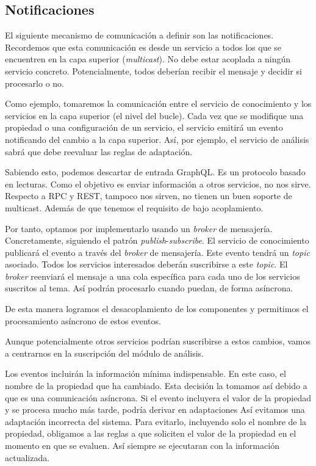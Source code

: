 \subsection{Notificaciones}

El siguiente mecanismo de comunicación a definir son las notificaciones. Recordemos que esta comunicación es desde un servicio a todos los que se encuentren en la capa superior (\emph{multicast}). No debe estar acoplada a ningún servicio concreto. Potencialmente, todos deberían recibir el mensaje y decidir si procesarlo o no.

Como ejemplo, tomaremos la comunicación entre el servicio de conocimiento y los servicios en la capa superior (el nivel del bucle). Cada vez que se modifique una propiedad o una configuración de un servicio, el servicio emitirá un evento notificando del cambio a la capa superior. Así, por ejemplo, el servicio de análisis sabrá que debe reevaluar las reglas de adaptación.

Sabiendo esto, podemos descartar de entrada GraphQL. Es un protocolo basado en lecturas. Como el objetivo es enviar información a otros servicios, no nos sirve. Respecto a RPC y REST, tampoco nos sirven, no tienen un buen soporte de multicast. Además de que tenemos el requisito de bajo acoplamiento.

Por tanto, optamos por implementarlo usando un \emph{broker} de mensajería. Concretamente, siguiendo el patrón \emph{publish}-\emph{subscribe}. El servicio de conocimiento publicará el evento a través del \emph{broker} de mensajería. Este evento tendrá un \emph{topic} asociado. Todos los servicios interesados deberán suscribirse a este \emph{topic}. El \emph{broker} reenviará el mensaje a una cola específica para cada uno de los servicios suscritos al tema. Así podrán procesarlo cuando puedan, de forma asíncrona.

De esta manera logramos el desacoplamiento de los componentes y permitimos el procesamiento asíncrono de estos eventos.

Aunque potencialmente otros servicios podrían suscribirse a estos cambios, vamos a centrarnos en la suscripción del módulo de análisis.

Los eventos incluirán la información mínima indispensable. En este caso, el nombre de la propiedad que ha cambiado. Esta decisión la tomamos así debido a que es una comunicación asíncrona. Si el evento incluyera el valor de la propiedad y se procesa mucho más tarde, podría derivar en adaptaciones Así evitamos una adaptación incorrecta del sistema. Para evitarlo, incluyendo solo el nombre de la propiedad, obligamos a las reglas a que soliciten el valor de la propiedad en el momento en que se evaluen. Así siempre se ejecutaran con la información actualizada.

